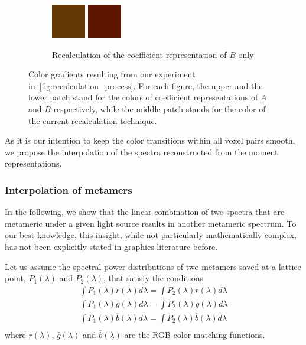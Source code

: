 \begin{figure}[t!]
\begin{subfigure}[t]{0.30\textwidth}
		\includegraphics[width=1\linewidth,height=4em]{img/recalculation_color_fitRed.png}
		\includegraphics[width=1\linewidth,height=4em]{img/recalculation_color_red.png}
		\caption{Recalculation of the coefficient representation of $B$ only}
		\label{fig:recalculation_colorGradients_red}
	\end{subfigure}
	\caption{Color gradients resulting from our experiment in~\cref{fig:recalculation_process}. For each figure, the upper and the lower patch stand for the colors of coefficient representations of $A$ and $B$ respectively, while the middle patch stands for the color of the current recalculation technique.}
	\label{fig:recalculation_colorGradients}
\end{figure}

As it is our intention to keep the color transitions within all voxel pairs smooth, we propose the interpolation of the spectra reconstructed from the moment representations.

\subsubsection{Interpolation of metamers}
\label{sect:ims}
In the following, we show that the linear combination of two spectra that are metameric under a given light source results in another metameric spectrum. To our best knowledge, this insight, while not particularly mathematically complex, has not been explicitly stated in graphics literature before.

Let us assume the spectral power distributions of two metamers saved at a lattice point, $P_1(\lambda)$ and $P_2(\lambda)$, that satisfy the conditions
\begin{equation} 
\begin{aligned}
\int P_1(\lambda)\overline{r}(\lambda)d\lambda=\int P_2(\lambda)\overline{r}(\lambda)d\lambda\\
\int P_1(\lambda)\overline{g}(\lambda)d\lambda=\int P_2(\lambda)\overline{g}(\lambda)d\lambda\\
\int P_1(\lambda)\overline{b}(\lambda)d\lambda=\int P_2(\lambda)\overline{b}(\lambda)d\lambda\\
\end{aligned}
\label{equation:metamers}
\end{equation}
where $\overline{r}(\lambda)$, $\overline{g}(\lambda)$ and $\overline{b}(\lambda)$ are the RGB color matching functions.

